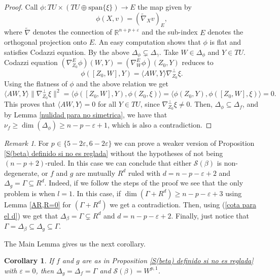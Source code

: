\documentclass{article}
\newtheorem{cor}[thm]{Corollary}
\theoremstyle{remark}
\newtheorem{remark}[thm]{Remark}
\begin{document}
\begin{proof}
    Call $\phi:TU\times(TU\oplus\text{span}\{\xi\})\rightarrow E$ the map given by
    \begin{equation*}
        \phi(X,v)=(\tilde{\nabla}_X v)_E,
    \end{equation*}
    where $\tilde{\nabla}$ denotes the connection of $\mathbb{R}^{n+p+\varepsilon}$ and the sub-index $E$ denotes the orthogonal projection onto $E$. An easy computation shows that $\phi$ is flat and satisfies Codazzi equation. By the above $\Delta_\phi\subsetneq\Delta_\gamma$. Take $W\in \Delta_\phi$ and $Y\in TU$. Codazzi equation $(\nabla_{Z_0}^E\phi)(W,Y)=(\nabla_W^E\phi)(Z_0,Y)$ reduces to
    \begin{equation*}\label{codazi de phi, caso degenerado}
        \phi([Z_0,W],Y)=\langle AW,Y\rangle\nabla_{Z_0}^{\perp} \xi.
    \end{equation*}
    Using the flatness of $\phi$ and the above relation we get
    $$\langle AW,Y\rangle\| \nabla_{Z_0}^\perp\xi\|^2=\langle\phi([Z_0,W],Y),\phi(Z_0,\xi)\rangle=\langle\phi(Z_0,Y),\phi([Z_0,W],\xi)\rangle=0.$$
    This proves that $\langle AW,Y\rangle=0$ for all $Y\in TU$, since $\nabla^\perp_{Z_0}\xi\neq 0$. Then, $\Delta_\phi\subseteq\Delta_f$, and by Lemma \ref{nulidad para no simetrica}, we have that $\nu_f\geq \dim(\Delta_\phi)\geq n-p-\varepsilon+1$, which is also a contradiction.
\end{proof}
\begin{remark}\label{p=5,6}
    For $p\in\{5-2\varepsilon,6-2\varepsilon\}$ we can prove a weaker version of Proposition \ref{S(beta) definido si no es reglada} without the hypotheses of not being $(n-p+2)$-ruled. In this case we can conclude that either $\mathcal{S}(\beta)$ is non-degenerate, or $f$ and $g$ are mutually $R^d$ ruled with $d=n-p-\varepsilon+2$ and $\Delta_g=\Gamma\subseteq R^d$. Indeed, if we follow the steps of the proof we see that the only problem is when $l=1$. In this case, if $\dim(\Gamma+R^d)\geq n-p-\varepsilon+3$ using Lemma \ref{AR,R=0} for $(\Gamma+R^d)$ we get a contradiction. Then, using (\ref{cota para el d}) we get that $\Delta_\beta=\Gamma\subsetneq R^d$ and $d=n-p-\varepsilon+2$. Finally, just notice that $\Gamma=\Delta_\beta\subseteq\Delta_g\subseteq\Gamma$.
\end{remark}
The Main Lemma gives us the next corollary.
\begin{cor}\label{corolario de no ser reglada}
    If $f$ and $g$ are as in Proposition \ref{S(beta) definido si no es reglada} with $\varepsilon=0$, then $\Delta_g=\Delta_f=\Gamma$ and $\mathcal{S}(\beta)=W^{p,1}$.
\end{cor}
\end{document}
